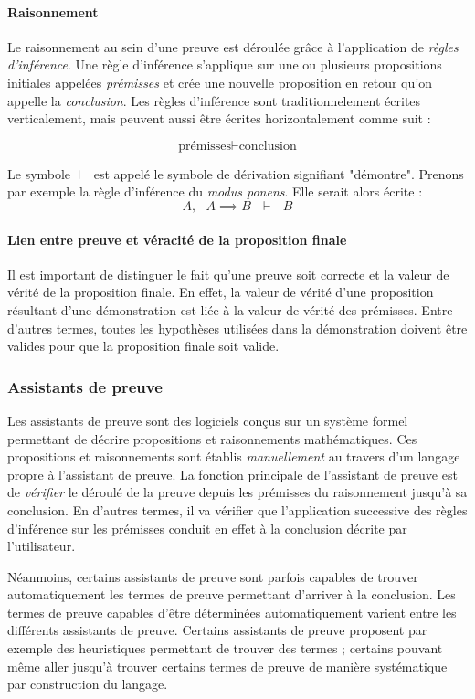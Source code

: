 			\paragraph{Raisonnement}
			Le raisonnement au sein d'une preuve est déroulée grâce à l'application de \emph{règles d'inférence}. Une règle d'inférence s'applique sur une ou plusieurs propositions initiales appelées \emph{prémisses} et crée une nouvelle proposition en retour qu'on appelle la \emph{conclusion}.
			Les règles d'inférence sont traditionnelement écrites verticalement, mais peuvent aussi être écrites horizontalement comme suit :

			$$ \text{prémisses} \vdash \text{conclusion}$$

			Le symbole $\vdash$ est appelé le symbole de dérivation signifiant "démontre". Prenons par exemple la règle d'inférence du \emph{modus ponens}. Elle serait alors écrite :
			$$ A,~~~A \implies B~~~\vdash~~~B $$

			\paragraph{Lien entre preuve et véracité de la proposition finale} Il est important de distinguer le fait qu'une preuve soit correcte et la valeur de vérité de la proposition finale. En effet, la valeur de vérité d'une proposition résultant d'une démonstration est liée à la valeur de vérité des prémisses. Entre d'autres termes, toutes les hypothèses utilisées dans la démonstration doivent être valides pour que la proposition finale soit valide.

			\subsubsection{Assistants de preuve}

			Les assistants de preuve sont des logiciels conçus sur un système formel permettant de décrire propositions et raisonnements mathématiques. Ces propositions et raisonnements sont établis \emph{manuellement} au travers d'un langage propre à l'assistant de preuve. La fonction principale de l'assistant de preuve est de \emph{vérifier} le déroulé de la preuve depuis les prémisses du raisonnement jusqu'à sa conclusion. En d'autres termes, il va vérifier que l'application successive des règles d'inférence sur les prémisses conduit en effet à la conclusion décrite par l'utilisateur.

			Néanmoins, certains assistants de preuve sont parfois capables de trouver automatiquement les termes de preuve permettant d'arriver à la conclusion. Les termes de preuve capables d'être déterminées automatiquement varient entre les différents assistants de preuve. Certains assistants de preuve proposent par exemple des heuristiques permettant de trouver des termes ; certains pouvant même aller jusqu'à trouver certains termes de preuve de manière systématique par construction du langage.

